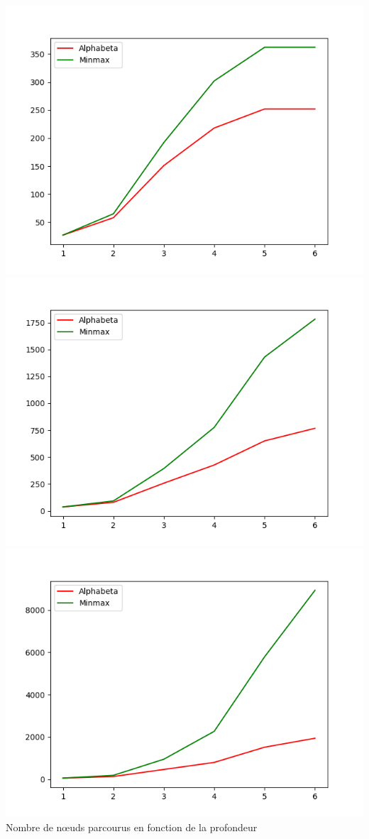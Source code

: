 \documentclass[a4paper,12pt]{article} %
\begin{document}
\begin{center}
\includegraphics[scale=0.5]{images/Figure_1.png}
\includegraphics[scale=0.5]{images/Figure_2.png}
\includegraphics[scale=0.5]{images/Figure_3.png}\\
Nombre de nœuds parcourus en fonction de la profondeur
\end{center}
\end{document}

